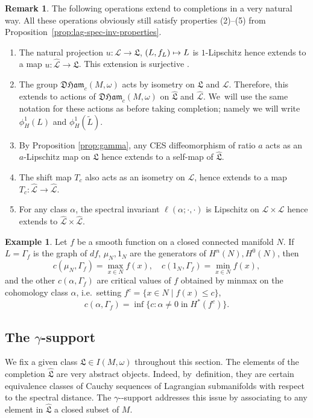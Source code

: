 \documentclass[10pt,a4paper]{amsart}
\newcommand{\ie}{i.e.\ }
\providecommand{\nobreakdash}{\nobreak\hbox{-}}
\newcommand\mto{\mathchoice{\longmapsto}{\mapsto}{\mapsto}{\mapsto}}
\theoremstyle{definition}
\newtheorem{rem}[thm]{Remark}
\newtheorem{example}[thm]{Example}
\newcommand {\LL}{{\mathcal L}}
\newcommand{\DHam}{\mathfrak{DHam}}
\newcommand{\fL}{\mathfrak {L}}
\newcommand{\hatL}{\widehat{\fL}}
\newcommand{\hatLL}{\widehat{\LL}}
\begin{document}
\begin{rem}\label{rem:completions} The following operations extend to completions in a very natural way. All these operations obviously still satisfy properties (2)--(5) from Proposition~\ref{prop:lag-spec-inv-properties}.
\begin{enumerate}
\item The natural projection $u:\LL\to\fL$, $(L, f_L)\mto L$ is $1$-Lipschitz hence extends to a map $u:\hatLL\to\hatL$. This extension is surjective \cite[Prop.\,5.5]{Viterbo-gammas}.
\item The group $\DHam_c(M,\omega)$ acts by isometry on $\fL$ and $\LL$. Therefore, this extends to actions of $\DHam_c(M,\omega)$ on $\hatL$ and $\hatLL$. We~will use the same notation for these actions as before taking completion; namely we will write $\phi_H^1(L)$ and $\phi_H^1(\tilde L)$.
\item By Proposition \ref{prop:gamma}, any CES diffeomorphism of ratio $a$ acts as an $a$-Lipschitz map on $\fL$ hence extends to a self-map of $\hatL$.
\item The shift map $T_c$ also acts as an isometry on $\LL$, hence extends to a map $T_c:\hatLL\to\hatLL$.
\item For any class $\alpha$, the spectral invariant $\ell(\alpha;\cdot, \cdot)$ is Lipschitz on $\LL\times\LL$ hence extends to $\hatLL\times\hatLL$.
\end{enumerate}
\end{rem}
\begin{example}
Let $f$ be a smooth function on a closed connected manifold $N$. If~$L=\Gamma_f$ is the graph of $df$, $\mu_N, 1_N$ are the generators of $H^n(N), H^0(N)$, then
\[
c(\mu_N,\Gamma_{f})=\max_{x\in N}f(x),\quad c(1_N,\Gamma_{f})=\min_{x\in N}f(x),
\]
and the other $c(\alpha,\Gamma_{f})$ are critical values of $f$ obtained by minmax on the cohomology class $\alpha$, \ie setting $f^c=\{x\in N \mid f(x)\leq c\}$,
\[
c(\alpha,\Gamma_f)=\inf\{c : \alpha \neq 0\;\text{in}\; H^*(f^c)\}.
\]
\end{example}

\subsection{The \texorpdfstring{$\gamma$}{gamma}-support}\label{sec:gamma-support}

We fix a given class $\fL\in I(M,\omega)$ throughout this section. The elements of the completion $\hatL$ are very abstract objects. Indeed, by~definition, they are certain equivalence classes of Cauchy sequences of Lagrangian submanifolds with respect to the spectral distance. The $\gamma$\nobreakdash-support addresses this issue by associating to any element in $\hatL$ a closed subset of $M$.
\end{document}
